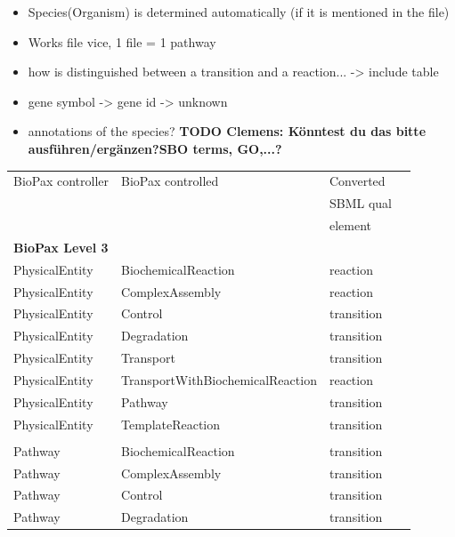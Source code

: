 \documentclass{bioinfo}
\begin{document}
\begin{methods}
\begin{itemize}
\item Species(Organism) is determined automatically (if it is mentioned in the file)
\item Works file vice, 1 file = 1 pathway
\item how is distinguished between a transition and a reaction... -> include table
\item gene symbol -> gene id -> unknown
\item annotations of the species? \textbf{TODO Clemens: K\"onntest du das bitte ausf\"uhren/erg\"anzen?SBO terms, GO,...?}
\end{itemize}


\begin{table}[!t]
{\begin{tabular}{llll}\toprule
BioPax controller & BioPax controlled               & Converted\\
                  &                                 & SBML qual\\
                  &                                 & element\\
\midrule
\textbf{BioPax Level 3}\\
\midrule
PhysicalEntity & BiochemicalReaction                & reaction\\
PhysicalEntity & ComplexAssembly                    & reaction\\
PhysicalEntity & Control                            & transition\\
PhysicalEntity & Degradation                        & transition\\
PhysicalEntity & Transport                          & transition\\
PhysicalEntity & TransportWithBiochemicalReaction   & reaction\\
PhysicalEntity & Pathway                            & transition\\
PhysicalEntity & TemplateReaction                   & transition\\
\\
Pathway         & BiochemicalReaction               & transition\\
Pathway         & ComplexAssembly                   & transition\\
Pathway         & Control                           & transition\\
Pathway         & Degradation                       & transition\\

\end{tabular}}
\end{table}
\end{methods}
\end{document}
